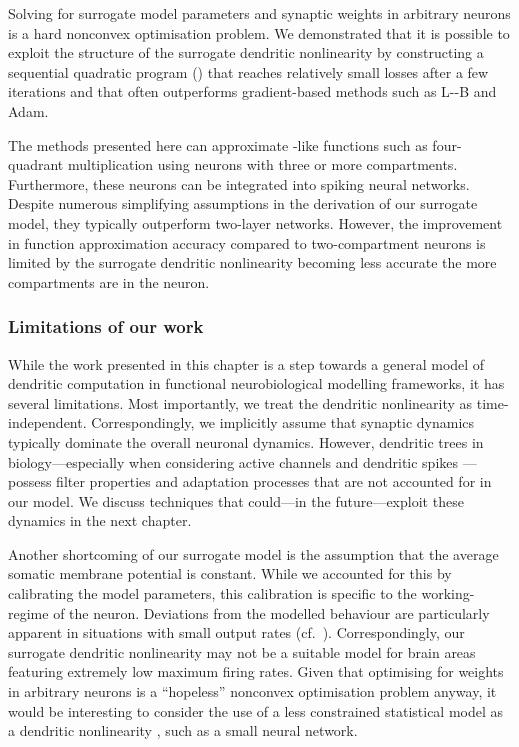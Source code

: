 Solving for surrogate model parameters and synaptic weights in arbitrary \nlif neurons is a hard nonconvex optimisation problem.
We demonstrated that it is possible to exploit the structure of the surrogate dendritic nonlinearity by constructing a sequential quadratic program (\SQP) that reaches relatively small losses after a few iterations and that often outperforms gradient-based methods such as L-\BFGS-B and Adam.

The methods presented here can approximate \XOR-like functions such as four-quadrant multiplication using \nlif neurons with three or more compartments.
Furthermore, these neurons can be integrated into spiking neural networks.
Despite numerous simplifying assumptions in the derivation of our surrogate model, they typically outperform two-layer networks.
However, the improvement in function approximation accuracy compared to two-compartment neurons is limited by the surrogate dendritic nonlinearity becoming less accurate the more compartments are in the neuron.

\subsubsection{Limitations of our work}
While the work presented in this chapter is a step towards a general model of dendritic computation in functional neurobiological modelling frameworks, it has several limitations.
Most importantly, we treat the dendritic nonlinearity \Hden as time-independent.
Correspondingly, we implicitly assume that synaptic dynamics typically dominate the overall neuronal dynamics.
However, dendritic trees in biology---especially when considering active channels and dendritic spikes \citep{koch1999biophysics,koch2002singlecell}---possess filter properties and adaptation processes that are not accounted for in our model.
We discuss techniques that could---in the future---exploit these dynamics in the next chapter.

Another shortcoming of our surrogate model \Hden is the assumption that the average somatic membrane potential is constant.
While we accounted for this by calibrating the model parameters, this calibration is specific to the working-regime of the neuron.
Deviations from the modelled behaviour are particularly apparent in situations with small output rates (cf.~).
Correspondingly, our surrogate dendritic nonlinearity may not be a suitable model for brain areas featuring extremely low maximum firing rates.
Given that optimising for weights in arbitrary \nlif neurons is a \enquote{hopeless} nonconvex optimisation problem anyway, it would be interesting to consider the use of a less constrained statistical model as a dendritic nonlinearity \Hden, such as a small neural network.

